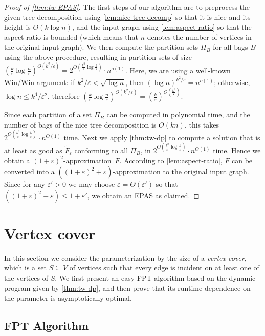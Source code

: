 \documentclass[a4paper]{article}
\theoremstyle{plain}
\newcommand{\eps}{{\varepsilon}}
\begin{document}
\begin{proof}[Proof of \autoref{thm:tw-EPAS}]

The first steps of our algorithm are to preprocess the given tree decomposition
using \autoref{lem:nice-tree-decomp} so that it is nice and its height is
$O(k\log n)$, and the input graph using \autoref{lem:aspect-ratio} so that the
aspect ratio is bounded (which means that $n$ denotes the number of vertices in
the original input graph). We then compute the partition sets $\Pi_B$ for all
bags $B$ using the above procedure, resulting in partition sets of size
$(\frac{k}{\eps}\log
\frac{n}{\eps})^{O(k^2/\eps)}=2^{O(\frac{k^2}{\eps}\log\frac{k}{\eps})}\cdot
n^{o(1)}$. Here, we are using a well-known Win/Win argument: if
$k^2/\eps<\sqrt{\log n}$, then $(\log n)^{k^2/\eps} = n^{o(1)}$; otherwise,
$\log n\le k^4/\eps^2$, therefore  $(\frac{k}{\eps}\log
\frac{n}{\eps})^{O(k^2/\eps)}=(\frac{k}{\eps})^{O(\frac{k^2}{\eps})}$.


Since each partition of a set $\Pi_B$ can be computed in polynomial time, and
the number of bags of the nice tree decomposition is $O(kn)$, this takes
$2^{O(\frac{k^2}{\eps}\log\frac{k}{\eps})}\cdot n^{O(1)}$ time. Next we apply
\autoref{thm:tw-dp} to compute a solution that is at least as good as
$\widetilde{F}_\eps$ conforming to all $\Pi_B$, in
$2^{O(\frac{k^2}{\eps}\log\frac{k}{\eps})}\cdot n^{O(1)}$ time. Hence we obtain
a $(1+\eps)^2$-approximation~$F$. According to \autoref{lem:aspect-ratio}, $F$
can be converted into a $((1+\eps)^2+\eps)$-approximation to the original input
graph. Since for any $\eps'>0$ we may choose $\eps=\Theta(\eps')$ so that
$((1+\eps)^2+\eps)\leq 1+\eps'$, we obtain an EPAS as claimed.  \end{proof}

%

\section{Vertex cover}
\label{sec:vc}

In this section we consider the parameterization by the size of a \emph{vertex cover}, which is a set $S\subseteq V$ of vertices such that every edge is incident on at least one of the vertices of $S$. 
We first present an easy FPT algorithm based on the dynamic program given by 
\cref{thm:tw-dp}, and then prove that its runtime dependence on the parameter is 
asymptotically optimal.
%

%
\subsection{FPT Algorithm}
\end{document}
